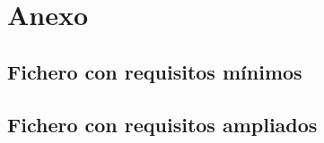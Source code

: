\documentclass[a4paper]{article}
\begin{document}

\newpage
\section{Anexo}\label{anexo:an}
\subsection{Fichero con requisitos mínimos} \label{anexo:ej_obli} 


\subsection{Fichero con requisitos ampliados} \label{anexo:ej_optat} 



\end{document}
